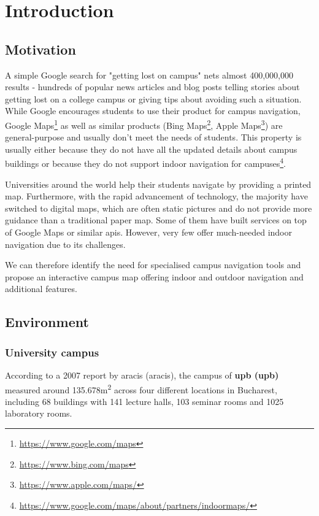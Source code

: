 \chapter{Introduction} \label{chapter:introduction}

\section{Motivation} \label{1:motivation}

    A simple Google search for "getting lost on campus" nets almost 400,000,000 results - hundreds of popular news articles and blog posts telling stories about getting lost on a college campus or giving tips about avoiding such a situation. While Google \cite{albertson2017googlemaps} encourages students to use their product for campus navigation, Google Maps\footnote{\url{https://www.google.com/maps}} as well as similar products (Bing Maps\footnote{\url{https://www.bing.com/maps}}, Apple Maps\footnote{\url{https://www.apple.com/maps/}}) are general-purpose and usually don't meet the needs of students. This property is usually either because they do not have all the updated details about campus buildings or because they do not support indoor navigation for campuses\footnote{\url{https://www.google.com/maps/about/partners/indoormaps/}}.
    
    Universities around the world help their students navigate by providing a printed map. Furthermore, with the rapid advancement of technology, the majority have switched to digital maps, which are often static pictures and do not provide more guidance than a traditional paper map. Some of them have built services on top of Google Maps or similar \acrshort{api}s. However, very few offer much-needed indoor navigation due to its challenges.
    
        
    We can therefore identify the need for specialised campus navigation tools and propose an interactive campus map offering indoor and outdoor navigation and additional features.

\section{Environment} \label{1:environment}

    \subsection{University campus} \label{1:university_campus}
        According to a 2007 report \cite{aracis2007raport}
        by \acrshort{aracis} (\acrlong{aracis}), the campus of \textbf{\acrlong{upb} (\acrshort{upb})} measured around 135.678m\textsuperscript{2} across four different locations in Bucharest, including 68 buildings with 141 lecture halls, 103 seminar rooms and 1025 laboratory rooms.
        
